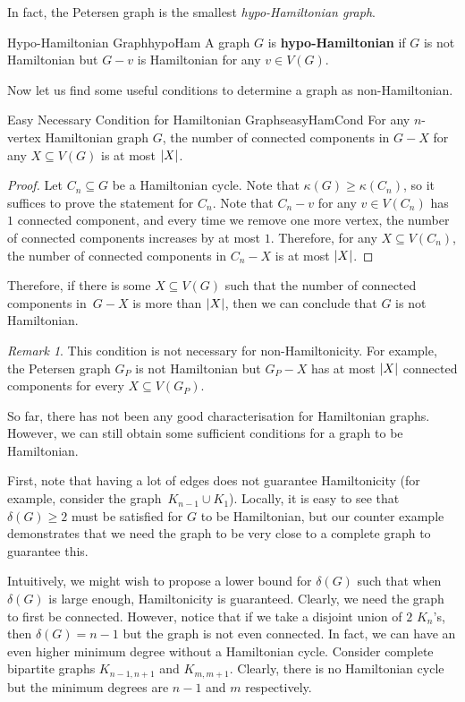 \documentclass[math]{amznotes}
\theoremstyle{remark}
\newtheorem*{remark}{Remark}
\begin{document}
In fact, the Petersen graph is the smallest \textit{hypo-Hamiltonian graph}.
\begin{dfnbox}{Hypo-Hamiltonian Graph}{hypoHam}
    A graph $G$ is {\color{red} \textbf{hypo-Hamiltonian}} if $G$ is not Hamiltonian but $G - v$ is Hamiltonian for any $v \in V(G)$.
\end{dfnbox}
Now let us find some useful conditions to determine a graph as non-Hamiltonian. 
\begin{probox}{Easy Necessary Condition for Hamiltonian Graphs}{easyHamCond}
    For any $n$-vertex Hamiltonian graph $G$, the number of connected components in $G - X$ for any $X \subseteq V(G)$ is at most ${\left\lvert {X} \right\rvert}$.
    \tcblower
    \begin{proof}
        Let $C_n \subseteq G$ be a Hamiltonian cycle. Note that $\kappa(G) \geq \kappa(C_n)$, so it suffices to prove the statement for $C_n$. Note that $C_n - v$ for any $v \in V(C_n)$ has $1$ connected component, and every time we remove one more vertex, the number of connected components increases by at most $1$. Therefore, for any $X \subseteq V(C_n)$, the number of connected components in $C_n - X$ is at most ${\left\lvert {X} \right\rvert}$.
    \end{proof}
\end{probox}
Therefore, if there is some $X \subseteq V(G)$ such that the number of connected components in~$G - X$ is more than ${\left\lvert {X} \right\rvert}$, then we can conclude that $G$ is not Hamiltonian. 
\begin{notebox}
    \begin{remark}
        This condition is not necessary for non-Hamiltonicity. For example, the Petersen graph $G_P$ is not Hamiltonian but $G_P - X$ has at most ${\left\lvert {X} \right\rvert}$ connected components for every $X \subseteq V(G_P)$.
    \end{remark}
\end{notebox}
So far, there has not been any good characterisation for Hamiltonian graphs. However, we can still obtain some sufficient conditions for a graph to be Hamiltonian.

First, note that having a lot of edges does not guarantee Hamiltonicity (for example, consider the graph~$K_{n - 1} \cup K_1$). Locally, it is easy to see that $\delta(G) \geq 2$ must be satisfied for $G$ to be Hamiltonian, but our counter example demonstrates that we need the graph to be very close to a complete graph to guarantee this.

Intuitively, we might wish to propose a lower bound for $\delta(G)$ such that when $\delta(G)$ is large enough, Hamiltonicity is guaranteed. Clearly, we need the graph to first be connected. However, notice that if we take a disjoint union of $2$ $K_n$'s, then $\delta(G) = n - 1$ but the graph is not even connected. In fact, we can have an even higher minimum degree without a Hamiltonian cycle. Consider complete bipartite graphs $K_{n - 1, n + 1}$ and $K_{m, m + 1}$. Clearly, there is no Hamiltonian cycle but the minimum degrees are $n - 1$ and $m$ respectively.
\end{document}
